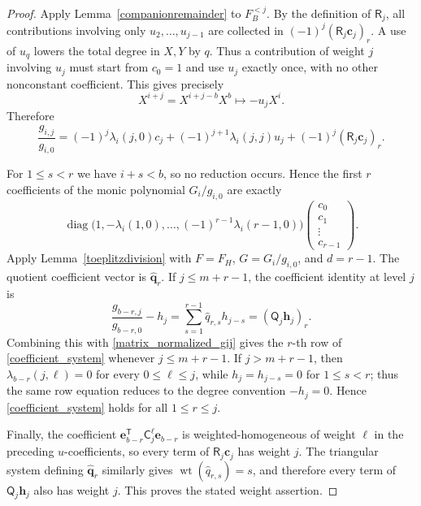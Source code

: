 \documentclass[10pt,a4paper]{amsart}
\begin{document}
\begin{proof}
Apply Lemma~\ref{companionremainder} to $F_B^{<j}$.  By the definition
of $\mathsf R_j$, all contributions involving only
$u_2,\ldots,u_{j-1}$ are collected in
$(-1)^j(\mathsf R_j\mathbf c_j)_r$.  A use of $u_q$ lowers the total
degree in $X,Y$ by $q$.  Thus a contribution of weight $j$ involving
$u_j$ must start from $c_0=1$ and use $u_j$ exactly once, with no other
nonconstant coefficient.  This gives precisely
\[
 X^{i+j}=X^{i+j-b}X^b\longmapsto-u_jX^i.
\]
Therefore
\begin{equation}\label{matrix_normalized_gij}
 \frac{g_{i,j}}{g_{i,0}}
 =(-1)^j\lambda_i(j,0)c_j
  +(-1)^{j+1}\lambda_i(j,j)u_j
  +(-1)^j(\mathsf R_j\mathbf c_j)_r.
\end{equation}

For $1\le s<r$ we have $i+s<b$, so no reduction occurs.  Hence the
first $r$ coefficients of the monic polynomial $G_i/g_{i,0}$ are
exactly
\[
 \operatorname{diag}\!\bigl(
  1,-\lambda_i(1,0),\ldots,(-1)^{r-1}\lambda_i(r-1,0)
 \bigr)
 \begin{pmatrix}c_0\\c_1\\\vdots\\c_{r-1}\end{pmatrix}.
\]
Apply Lemma~\ref{toeplitzdivision} with $F=F_H$,
$G=G_i/g_{i,0}$, and $d=r-1$.  The quotient coefficient vector is
$\widehat{\mathbf q}_r$.  If $j\le m+r-1$, the coefficient identity at level $j$ is
\begin{equation*}
 \frac{g_{b-r,j}}{g_{b-r,0}}-h_j
 =\sum_{s=1}^{r-1}\widehat q_{r,s}h_{j-s}
 =(\mathsf Q_j\mathbf h_j)_r.
\end{equation*}
Combining this with \eqref{matrix_normalized_gij} gives the $r$-th row
of \eqref{coefficient_system} whenever $j\le m+r-1$.  If $j>m+r-1$, then
$\lambda_{b-r}(j,\ell)=0$ for every $0\le\ell\le j$, while
$h_j=h_{j-s}=0$ for $1\le s<r$; thus the same row equation reduces to
the degree convention $-h_j=0$.  Hence \eqref{coefficient_system}
holds for all $1\le r\le j$.

Finally, the coefficient
$\mathbf e_{b-r}^{\mathsf T}\mathsf C_j^\ell \mathbf e_{b-r}$ is
weighted-homogeneous of weight $\ell$ in the preceding $u$-coefficients,
so every term of $\mathsf R_j\mathbf c_j$ has weight $j$.
The triangular system defining $\widehat{\mathbf q}_r$ similarly gives
$\operatorname{wt}(\widehat q_{r,s})=s$, and therefore every term of
$\mathsf Q_j\mathbf h_j$ also has weight $j$.  This proves the stated
weight assertion.
\end{proof}
\end{document}
